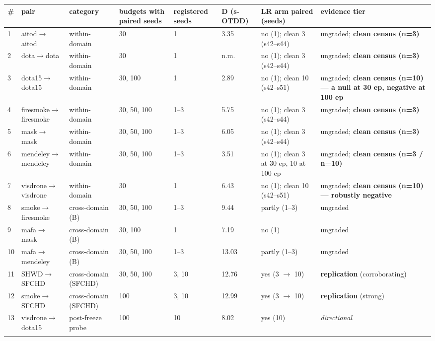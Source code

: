 \documentclass[pdflatex,sn-mathphys-ay]{sn-jnl}
\begin{document}
{\footnotesize
\setlength{\tabcolsep}{4pt}
\begin{longtable}{p{}p{}p{}p{}p{}p{}p{}p{}}
\toprule
\# & pair & category & budgets with paired seeds & registered seeds & D (s-OTDD) & LR arm paired (seeds) & evidence tier \\
\midrule
\endhead
1 & aitod\ensuremath{\rightarrow}aitod & within-domain & 30 & 1 & 3.35 & no (1); clean 3 (s42--s44) & ungraded; \textbf{clean census (n=3)} \\
2 & dota\ensuremath{\rightarrow}dota & within-domain & 30 & 1 & n.m. & no (1); clean 3 (s42--s44) & ungraded; \textbf{clean census (n=3)} \\
3 & dota15\ensuremath{\rightarrow}dota15 & within-domain & 30, 100 & 1 & 2.89 & no (1); clean 10 (s42--s51) & ungraded; \textbf{clean census (n=10) --- a null at 30 ep, negative at 100 ep} \\
4 & firesmoke\ensuremath{\rightarrow}firesmoke & within-domain & 30, 50, 100 & 1--3 & 5.75 & no (1); clean 3 (s42--s44) & ungraded; \textbf{clean census (n=3)} \\
5 & mask\ensuremath{\rightarrow}mask & within-domain & 30, 50, 100 & 1--3 & 6.05 & no (1); clean 3 (s42--s44) & ungraded; \textbf{clean census (n=3)} \\
6 & mendeley\ensuremath{\rightarrow}mendeley & within-domain & 30, 50, 100 & 1--3 & 3.51 & no (1); clean 3 at 30 ep, 10 at 100 ep & ungraded; \textbf{clean census (n=3 / n=10)} \\
7 & visdrone\ensuremath{\rightarrow}visdrone & within-domain & 30 & 1 & 6.43 & no (1); clean 10 (s42--s51) & ungraded; \textbf{clean census (n=10) --- robustly negative} \\
8 & smoke\ensuremath{\rightarrow}firesmoke & cross-domain (B) & 30, 50, 100 & 1--3 & 9.44 & partly (1--3) & ungraded \\
9 & mafa\ensuremath{\rightarrow}mask & cross-domain (B) & 30, 100 & 1 & 7.19 & no (1) & ungraded \\
10 & mafa\ensuremath{\rightarrow}mendeley & cross-domain (B) & 30, 50, 100 & 1--3 & 13.03 & partly (1--3) & ungraded \\
11 & SHWD\ensuremath{\rightarrow}SFCHD & cross-domain (SFCHD) & 30, 50, 100 & 3, 10 & 12.76 & yes (3 \ensuremath{\rightarrow} 10) & \textbf{replication} (corroborating) \\
12 & smoke\ensuremath{\rightarrow}SFCHD & cross-domain (SFCHD) & 100 & 3, 10 & 12.99 & yes (3 \ensuremath{\rightarrow} 10) & \textbf{replication} (strong) \\
13 & visdrone\ensuremath{\rightarrow}dota15 & post-freeze probe & 100 & 10 & 8.02 & yes (10) & \emph{directional} \\
\botrule
\end{longtable}}
\end{document}
